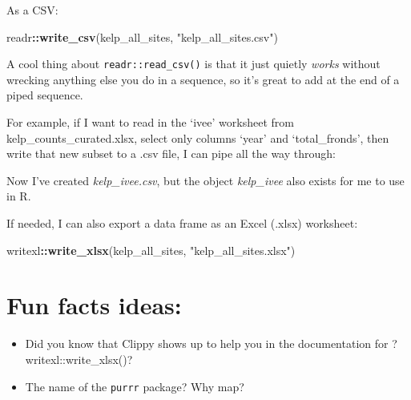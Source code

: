 \documentclass[]{book}
\newenvironment{Shaded}{\begin{snugshade}}{\end{snugshade}}
\newcommand{\DataTypeTok}[1]{\textcolor[rgb]{0.13,0.29,0.53}{#1}}
\newcommand{\KeywordTok}[1]{\textcolor[rgb]{0.13,0.29,0.53}{\textbf{#1}}}
\newcommand{\NormalTok}[1]{#1}
\newcommand{\OperatorTok}[1]{\textcolor[rgb]{0.81,0.36,0.00}{\textbf{#1}}}
\newcommand{\StringTok}[1]{\textcolor[rgb]{0.31,0.60,0.02}{#1}}
\providecommand{\tightlist}{%
  \setlength{\itemsep}{0pt}\setlength{\parskip}{0pt}}
\begin{document}
As a CSV:

\begin{Shaded}
\begin{Highlighting}[]
\NormalTok{readr}\OperatorTok{::}\KeywordTok{write_csv}\NormalTok{(kelp_all_sites, }\StringTok{"kelp_all_sites.csv"}\NormalTok{)}
\end{Highlighting}
\end{Shaded}

A cool thing about \texttt{readr::read\_csv()} is that it just quietly \emph{works} without wrecking anything else you do in a sequence, so it's great to add at the end of a piped sequence.

For example, if I want to read in the `ivee' worksheet from kelp\_counts\_curated.xlsx, select only columns `year' and `total\_fronds', then write that new subset to a .csv file, I can pipe all the way through:

\begin{Shaded}
\end{Shaded}

Now I've created \emph{kelp\_ivee.csv}, but the object \emph{kelp\_ivee} also exists for me to use in R.

If needed, I can also export a data frame as an Excel (.xlsx) worksheet:

\begin{Shaded}
\begin{Highlighting}[]
\NormalTok{writexl}\OperatorTok{::}\KeywordTok{write_xlsx}\NormalTok{(kelp_all_sites, }\StringTok{"kelp_all_sites.xlsx"}\NormalTok{)}
\end{Highlighting}
\end{Shaded}

\hypertarget{fun-facts-ideas}{%
\section{Fun facts ideas:}\label{fun-facts-ideas}}

\begin{itemize}
\tightlist
\item
  Did you know that Clippy shows up to help you in the documentation for ?writexl::write\_xlsx()?
\item
  The name of the \texttt{purrr} package? Why map?
\end{itemize}
\end{document}
